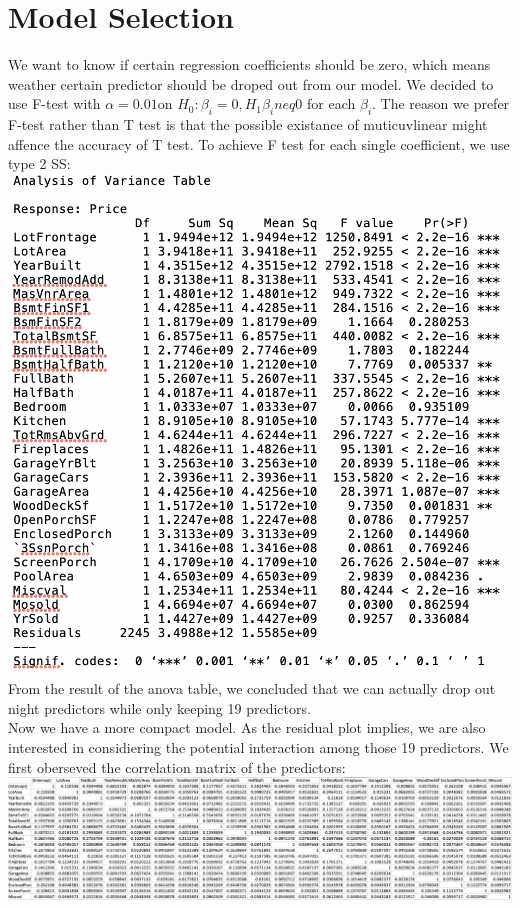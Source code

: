 \documentclass{article}
\begin{document}
\section*{Model Selection}
We want to know if certain regression coefficients should be zero, which means weather certain predictor should be droped out from our model. We decided to use F-test with $\alpha = 0.01 $on $H_0: \beta_i = 0, H_1 \beta_i neq 0$ for each $\beta_i$. The reason we prefer F-test rather than T test is that the possible existance of muticuvlinear might affence the accuracy of T test. To achieve F test for each single coefficient, we use type 2 SS:\\
\includegraphics[scale = 0.5]{my_anova1.png} \\
From the result of the anova table, we concluded that we can actually drop out night predictors while only keeping 19 predictors.\\
Now we have a more compact model. As the residual plot implies, we are also interested in considiering the potential interaction among those 19 predictors. We first oberseved the correlation matrix of the predictors:\\
\includegraphics[scale = 0.4]{cor.png}\\
\end{document}

